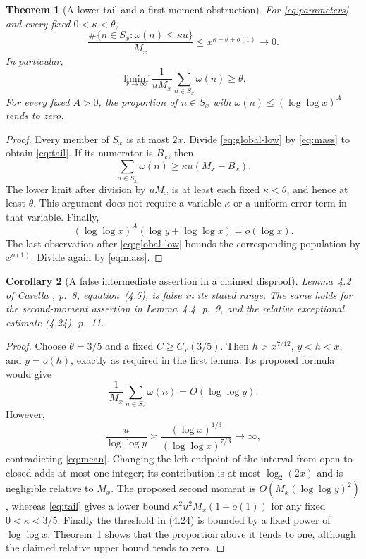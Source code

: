 \documentclass[11pt]{amsart}
\newtheorem{theorem}{Theorem}[section]
\newtheorem{corollary}[theorem]{Corollary}
\theoremstyle{definition}
\theoremstyle{remark}
\newcommand{\loglog}{\log\log}
\begin{document}
\begin{theorem}[A lower tail and a first-moment obstruction]\label{thm:tail}
For \eqref{eq:parameters} and every fixed $0<\kappa<\theta$,
\begin{equation}\label{eq:tail}
 \frac{\#\{n\in S_x:\omega(n)\le\kappa u\}}{M_x}
 \le x^{\kappa-\theta+o(1)}\longrightarrow0.
\end{equation}
In particular,
\begin{equation}\label{eq:mean}
 \liminf_{x\to\infty}\frac1{uM_x}
          \sum_{n\in S_x}\omega(n)\ge\theta.
\end{equation}
For every fixed $A>0$, the proportion of $n\in S_x$ with
$\omega(n)\le(\loglog x)^A$ tends to zero.
\end{theorem}
\begin{proof}
Every member of $S_x$ is at most $2x$. Divide \eqref{eq:global-low} by
\eqref{eq:mass} to obtain \eqref{eq:tail}. If its numerator is $B_x$, then
\[
 \sum_{n\in S_x}\omega(n)\ge\kappa u(M_x-B_x).
\]
The lower limit after division by $uM_x$ is at least each fixed
$\kappa<\theta$, and hence at least $\theta$. This argument does not
require a variable $\kappa$ or a uniform error term in that variable.
Finally,
\[
 (\loglog x)^A(\log y+\loglog x)=o(\log x).
\]
The last observation after \eqref{eq:global-low} bounds the corresponding
population by $x^{o(1)}$. Divide again by \eqref{eq:mass}.
\end{proof}

\begin{corollary}[A false intermediate assertion in a claimed disproof]
\label{cor:carella}
Lemma~4.2 of Carella \cite{Carella}, p.~8, equation~(4.5), is false in its
stated range. The same holds for the second-moment assertion in
Lemma~4.4, p.~9, and the relative exceptional estimate (4.24), p.~11.
\end{corollary}
\begin{proof}
Choose $\theta=3/5$ and a fixed $C\ge C_Y(3/5)$.
Then $h>x^{7/12}$, $y<h<x$, and $y=o(h)$, exactly as required in the
first lemma. Its proposed formula would give
\[
 \frac1{M_x}\sum_{n\in S_x}\omega(n)=O(\loglog y).
\]
However,
\[
 \frac{u}{\loglog y}\asymp
 \frac{(\log x)^{1/3}}{(\loglog x)^{7/3}}\longrightarrow\infty,
\]
contradicting \eqref{eq:mean}. Changing the left endpoint of the interval
from open to closed adds at most one integer; its contribution is at most
$\log_2(2x)$ and is negligible relative to $M_x$.
The proposed second moment is $O(M_x(\loglog y)^2)$, whereas
\eqref{eq:tail} gives a lower bound
$\kappa^2u^2M_x(1-o(1))$ for any fixed $0<\kappa<3/5$.
Finally the threshold in (4.24) is bounded by a fixed power of
$\loglog x$. Theorem~\ref{thm:tail} shows that the proportion above it
tends to one, although the claimed relative upper bound tends to zero.
\end{proof}
\end{document}
